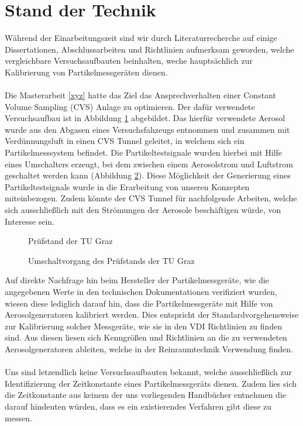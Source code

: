 \section{Stand der Technik}
W\"{a}hrend der Einarbeitungszeit sind wir durch Literaturrecherche auf einige Dissertationen, Abschlussarbeiten und Richtlinien aufmerksam geworden, welche vergleichbare Versuchsaufbauten beinhalten, weche haupts\"{a}chlich zur Kalibrierung von Partikelmessger\"{a}ten dienen.
\\
\\
Die Masterarbeit \ref{xyz} hatte das Ziel das Ansprechverhalten einer Constant Volume Sampling (CVS) Anlage zu optimieren. Der daf\"{u}r verwendete Versuchsaufbau ist in Abbildung \ref{aufbau_graz} abgebildet. Das hierf\"{u}r verwendete Aerosol wurde aus den Abgasen eines Versuchsfahzeugs entnommen und zusammen mit Verd\"{u}nnungsluft in einen CVS Tunnel geleitet, in welchem sich ein Partikelmesssystem befindet. Die Partikeltestsignale wurden hierbei mit Hilfe eines Umschalters erzeugt, bei dem zwischen einem Aerosolstrom und Luftstrom geschaltet werden kann (Abbildung \ref{umschalter_graz}). Diese M\"{o}glichkeit der Generierung eines Partikeltestsignals wurde in die Erarbeitung von unseren Konzepten miteinbezogen. Zudem k\"{o}nnte der CVS Tunnel f\"{u}r nachfolgende Arbeiten, welche sich ausschlie{\ss}lich mit den Str\"{o}mungen der Aerosole besch\"{a}ftigen w\"{u}rde, von Interesse sein.
\\
\begin{figure}
	\centering
	\caption{Pr\"{u}fstand der TU Graz}
	\label{aufbau_graz}
\end{figure}

\begin{figure}
	\centering
	\caption{Umschaltvorgang des Pr\"{u}fstands der TU Graz}
	\label{umschalter_graz}
\end{figure}
Auf direkte Nachfrage hin beim Hersteller der Partikelmessger\"{a}te, wie die angegebenen Werte in den technischen Dokumentationen verifiziert wurden, wiesen diese lediglich darauf hin, dass die Partikelmessger\"{a}te mit Hilfe von Aerosolgeneratoren kalibriert werden. Dies entspricht der Standardvorgehensweise zur Kalibrierung solcher Messger\"{a}te, wie sie in den VDI Richtlinien zu finden sind. Aus diesen liesen sich Kenngr\"{o}{\ss}en und Richtlinien an die zu verwendeten Aerosolgeneratoren ableiten, welche in der Reinraumtechnik Verwendung finden.
\\
\\
Uns sind letzendlich keine Versuchsaufbauten bekannt, welche ausschlie{\ss}lich zur Identifizierung der Zeitkonstante eines Partikelmessger\"{a}ts dienen. Zudem lies sich die Zeitkonstante aus keinem der uns vorliegenden Handb\"{u}cher entnehmen die darauf hindeuten w\"{u}rden, dass es ein existierendes Verfahren gibt diese zu messen. 